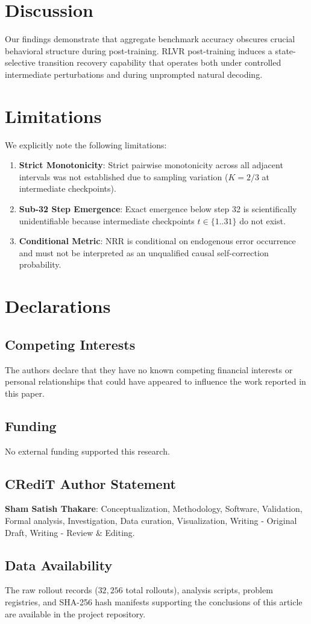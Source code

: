 \documentclass[11pt,3p,review]{elsarticle}
\begin{document}
\section{Discussion}
Our findings demonstrate that aggregate benchmark accuracy obscures crucial behavioral structure during post-training. RLVR post-training induces a state-selective transition recovery capability that operates both under controlled intermediate perturbations and during unprompted natural decoding.

\section{Limitations}
We explicitly note the following limitations:
\begin{enumerate}
    \item \textbf{Strict Monotonicity}: Strict pairwise monotonicity across all adjacent intervals was not established due to sampling variation ($K=2/3$ at intermediate checkpoints).
    \item \textbf{Sub-32 Step Emergence}: Exact emergence below step 32 is scientifically unidentifiable because intermediate checkpoints $t \in \{1..31\}$ do not exist.
    \item \textbf{Conditional Metric}: $\text{NRR}$ is conditional on endogenous error occurrence and must not be interpreted as an unqualified causal self-correction probability.
\end{enumerate}

\section{Declarations}
\subsection{Competing Interests}
The authors declare that they have no known competing financial interests or personal relationships that could have appeared to influence the work reported in this paper.

\subsection{Funding}
No external funding supported this research.

\subsection{CRediT Author Statement}
\textbf{Sham Satish Thakare}: Conceptualization, Methodology, Software, Validation, Formal analysis, Investigation, Data curation, Visualization, Writing - Original Draft, Writing - Review \& Editing.

\subsection{Data Availability}
The raw rollout records ($32,256$ total rollouts), analysis scripts, problem registries, and SHA-256 hash manifests supporting the conclusions of this article are available in the project repository.



\end{document}
